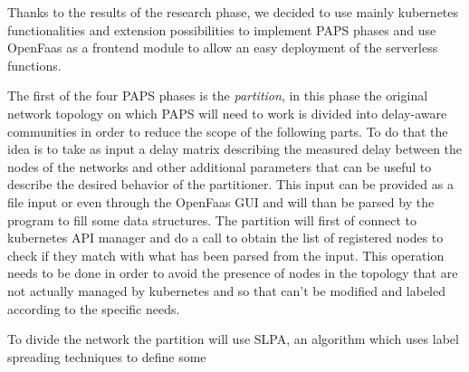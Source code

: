 Thanks to the results of the research phase, we decided to use mainly kubernetes functionalities
and extension possibilities to implement PAPS phases and use OpenFaas as a frontend module to 
allow an easy deployment of the serverless functions.

The first of the four PAPS phases is the \textit{partition}, in this phase the original 
network topology on which PAPS will need to work is divided into delay-aware communities in 
order to reduce the scope of the following parts. To do that the idea is to take as input a 
delay matrix describing the measured delay between the nodes of the networks and other 
additional parameters that can be useful to describe the desired behavior of the partitioner.
This input can be provided as a file input or even through the OpenFaas GUI and will than be
parsed by the program to fill some data structures. The partition will first of connect to 
kubernetes API manager and do a call to obtain the list of registered nodes to check if they 
match with what has been parsed from the input. This operation needs to be done in order to
avoid the presence of nodes in the topology that are not actually managed by kubernetes and 
so that can't be modified and labeled according to the specific needs. 

To divide the network the partition will use SLPA, an algorithm which uses label spreading 
techniques to define some  